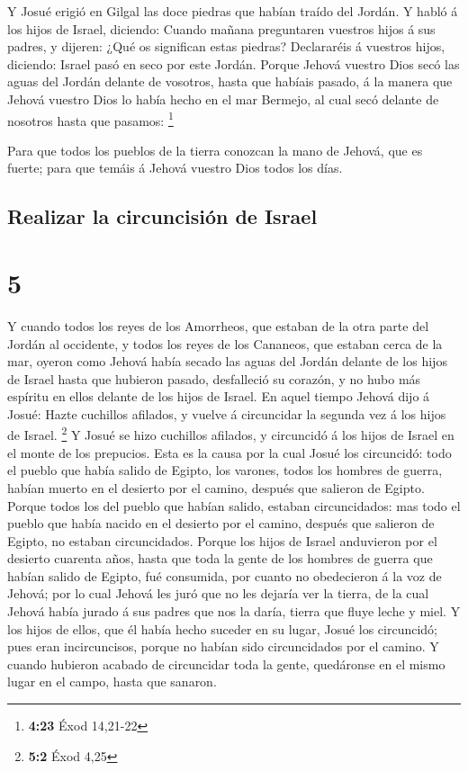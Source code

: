  Y Josué erigió en Gilgal las doce piedras que habían
traído del Jordán.  Y habló á los hijos de Israel,
diciendo: Cuando mañana preguntaren vuestros hijos á sus padres, y
dijeren: ¿Qué os significan estas piedras?  Declararéis á
vuestros hijos, diciendo: Israel pasó en seco por este Jordán.
 Porque Jehová vuestro Dios secó las aguas del Jordán
delante de vosotros, hasta que habíais pasado, á la manera que Jehová
vuestro Dios lo había hecho en el mar Bermejo, al cual secó delante de
nosotros hasta que pasamos: \footnote{\textbf{4:23} Éxod 14,21-22}

 Para que todos los pueblos de la tierra conozcan la mano
de Jehová, que es fuerte; para que temáis á Jehová vuestro Dios todos
los días.

\hypertarget{realizar-la-circuncisiuxf3n-de-israel}{%
\subsection{Realizar la circuncisión de
Israel}\label{realizar-la-circuncisiuxf3n-de-israel}}

\hypertarget{section-4}{%
\section{5}\label{section-4}}

 Y cuando todos los reyes de los Amorrheos, que estaban de
la otra parte del Jordán al occidente, y todos los reyes de los
Cananeos, que estaban cerca de la mar, oyeron como Jehová había secado
las aguas del Jordán delante de los hijos de Israel hasta que hubieron
pasado, desfalleció su corazón, y no hubo más espíritu en ellos delante
de los hijos de Israel.  En aquel tiempo Jehová dijo á
Josué: Hazte cuchillos afilados, y vuelve á circuncidar la segunda vez á
los hijos de Israel. \footnote{\textbf{5:2} Éxod 4,25}  Y
Josué se hizo cuchillos afilados, y circuncidó á los hijos de Israel en
el monte de los prepucios.  Esta es la causa por la cual
Josué los circuncidó: todo el pueblo que había salido de Egipto, los
varones, todos los hombres de guerra, habían muerto en el desierto por
el camino, después que salieron de Egipto.  Porque todos los
del pueblo que habían salido, estaban circuncidados: mas todo el pueblo
que había nacido en el desierto por el camino, después que salieron de
Egipto, no estaban circuncidados.  Porque los hijos de
Israel anduvieron por el desierto cuarenta años, hasta que toda la gente
de los hombres de guerra que habían salido de Egipto, fué consumida, por
cuanto no obedecieron á la voz de Jehová; por lo cual Jehová les juró
que no les dejaría ver la tierra, de la cual Jehová había jurado á sus
padres que nos la daría, tierra que fluye leche y miel.  Y
los hijos de ellos, que él había hecho suceder en su lugar, Josué los
circuncidó; pues eran incircuncisos, porque no habían sido circuncidados
por el camino.  Y cuando hubieron acabado de circuncidar
toda la gente, quedáronse en el mismo lugar en el campo, hasta que
sanaron.

